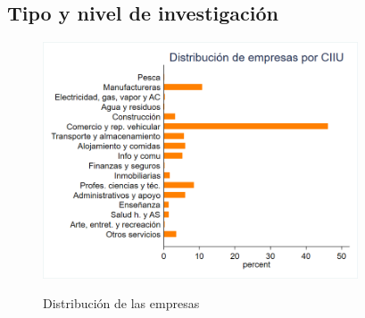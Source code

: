 \documentclass[12pt,a4paper]{article} %
\begin{document}
    \subsection{Tipo y nivel de investigación}
			\lipsum[1]
			\begin{figure}[h]
				\centering
				\caption{Distribución de las empresas}
				\includegraphics[height=7cm]{EXAMEN_FINAL/Imagenes/Graph1.png}
				\label{fig: Distribución de las empresas}
			\end{figure}

\end{document}
